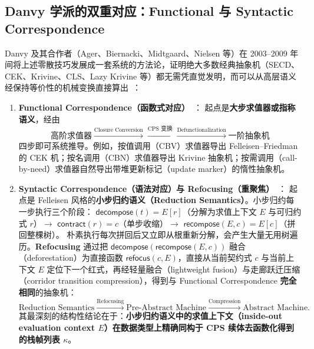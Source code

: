 \documentclass[UTF8,a4paper,11pt,fontset=fandol]{ctexart}
\newcommand{\kw}[1]{\mathsf{#1}}
\begin{document}
\subsection{Danvy 学派的双重对应：Functional 与 Syntactic Correspondence}

Danvy 及其合作者（Ager、Biernacki、Midtgaard、Nielsen 等）在 2003--2009 年间将上述零散技巧发展成一套系统的方法论，证明绝大多数经典抽象机（SECD、CEK、Krivine、CLS、Lazy Krivine 等）都无需凭直觉发明，而可以从高层语义经保持等价性的机械变换直接算出~\cite{ager2003functional,danvy2004refocusing,biernacka2007concrete}：

\begin{enumerate}
\item \textbf{Functional Correspondence（函数式对应）}~\cite{ager2003functional}：
  起点是\textbf{大步求值器或指称语义}，经由
  \[
  \text{高阶求值器}
  \xrightarrow{\text{Closure Conversion}}
  \xrightarrow{\text{CPS 变换}}
  \xrightarrow{\text{Defunctionalization}}
  \text{一阶抽象机}
  \]
  四步即可系统推导。例如，按值调用（CBV）求值器导出 Felleisen--Friedman 的 CEK 机；按名调用（CBN）求值器导出 Krivine 抽象机；按需调用（call-by-need）求值器自然导出带堆更新标记（update marker）的惰性抽象机。

\item \textbf{Syntactic Correspondence（语法对应）与 Refocusing（重聚焦）}~\cite{danvy2004refocusing,biernacka2007concrete}：
  起点是 Felleisen 风格的\textbf{小步归约语义（Reduction Semantics）}。小步归约每一步执行三个阶段：
  $\kw{decompose}(t) = E[r]$（分解为求值上下文 $E$ 与可归约式 $r$）$\to$ $\kw{contract}(r) = c$（单步收缩）$\to$ $\kw{recompose}(E, c) = E[c]$（拼回整棵树）。
  朴素执行每次拼回后又立即从根重新分解，会产生大量无用树遍历。\textbf{Refocusing} 通过把 $\kw{decompose}(\kw{recompose}(E, c))$ 融合（deforestation）为直接函数 $\kw{refocus}(c, E)$，直接从当前契约式 $c$ 与当前上下文 $E$ 定位下一个红式，再经轻量融合（lightweight fusion）与走廊跃迁压缩（corridor transition compression），得到与 Functional Correspondence \textbf{完全相同}的抽象机：
  \[
  \text{Reduction Semantics}
  \xrightarrow{\text{Refocusing}}
  \text{Pre-Abstract Machine}
  \xrightarrow{\text{Compression}}
  \text{Abstract Machine}.
  \]
  其最深刻的结构性结论在于：\textbf{小步归约语义中的求值上下文（inside-out evaluation context $E$）在数据类型上精确同构于 CPS 续体去函数化得到的栈帧列表 $\kappa$}。
\end{enumerate}
\end{document}
